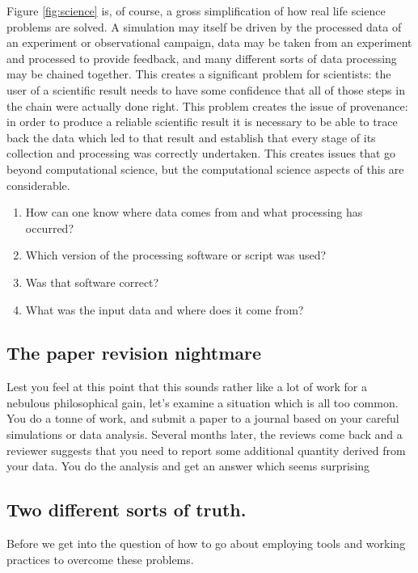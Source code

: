 \documentclass[a4paper,12pt]{article}
\theoremstyle{definition}
\begin{document}
Figure \ref{fig:science} is, of course, a gross simplification of how real
life science problems are solved. A simulation may itself be driven by the
processed data of an experiment or observational campaign, data may be taken
from an experiment and processed to provide feedback, and many different
sorts of data processing may be chained together. This creates a significant
problem for scientists: the user of a scientific result needs to have some
confidence that all of those steps in the chain were actually done
right. This problem creates the issue of provenance: in order to produce a
reliable scientific result it is necessary to be able to trace back the data
which led to that result and establish that every stage of its collection
and processing was correctly undertaken. This creates issues that go beyond
computational science, but the computational science aspects of this are
considerable.
\begin{enumerate}
\item How can one know where data comes from and what processing has
  occurred?
\item Which version of the processing software or script was used?
\item Was that software correct?
\item What was the input data and where does it come from?
\end{enumerate}

\subsection{The paper revision nightmare}

Lest you feel at this point that this sounds rather like a lot of work for a
nebulous philosophical gain, let's examine a situation which is all too
common. You do a tonne of work, and submit a paper to a journal based on
your careful simulations or data analysis. Several months later, the reviews
come back and a reviewer suggests that you need to report some additional
quantity derived from your data. You do the analysis and get an answer which
seems surprising 

\subsection{Two different sorts of truth.}

Before we get into the question of how to go about employing tools and
working practices to overcome these problems.
\end{document}
